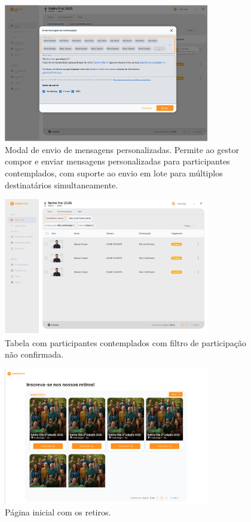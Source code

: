 \begin{figure}[H]
\centering
\includegraphics[width=0.8\textwidth]{images/prototipacao/gestao_retiros_geral/ContemplaçãoModal.png}
\caption{Modal de envio de mensagens personalizadas. Permite ao gestor compor e enviar mensagens personalizadas para participantes contemplados, com suporte ao envio em lote para múltiplos destinatários simultaneamente.}
\end{figure}

\begin{figure}[H]
\centering
\includegraphics[width=0.8\textwidth]{images/prototipacao/gestao_retiros_geral/Pendentes.png}
\caption{Tabela com participantes contemplados com filtro de participação não confirmada.}
\end{figure}

\begin{figure}[H]
\centering
\includegraphics[width=0.8\textwidth]{images/prototipacao/form_publico/listVierPage.png}
\caption{Página inicial com os retiros.}
\end{figure}

